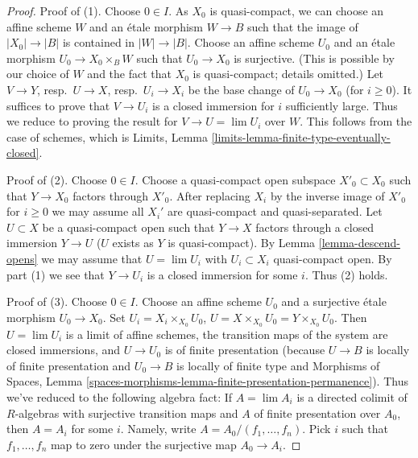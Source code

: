 \begin{proof}
Proof of (1). Choose $0 \in I$. As $X_0$ is quasi-compact, we can choose
an affine scheme $W$ and an \'etale morphism $W \to B$ such that the image of
$|X_0| \to |B|$ is contained in $|W| \to |B|$. 
Choose an affine scheme $U_0$ and an \'etale morphism
$U_0 \to X_0 \times_B W$ such that $U_0 \to X_0$ is surjective.
(This is possible by our choice of $W$ and the fact that $X_0$ is
quasi-compact; details omitted.)
Let $V \to Y$, resp.\ $U \to X$, resp.\ $U_i \to X_i$ be the base change
of $U_0 \to X_0$ (for $i \geq 0$). It suffices to prove that $V \to U_i$
is a closed immersion for $i$ sufficiently large. Thus we reduce
to proving the result for $V \to U = \lim U_i$ over $W$. This follows from
the case of schemes, which is
Limits, Lemma \ref{limits-lemma-finite-type-eventually-closed}.

\medskip\noindent
Proof of (2). Choose $0 \in I$. Choose a quasi-compact open subspace
$X'_0 \subset X_0$ such that $Y \to X_0$ factors through $X'_0$.
After replacing $X_i$ by the inverse image of $X'_0$ for $i \geq 0$
we may assume all $X_i'$ are quasi-compact and quasi-separated.
Let $U \subset X$ be a quasi-compact open such that $Y \to X$ factors
through a closed immersion $Y \to U$ ($U$ exists as $Y$ is quasi-compact). By
Lemma \ref{lemma-descend-opens}
we may assume that $U = \lim U_i$ with $U_i \subset X_i$ quasi-compact
open. By part (1) we see that $Y \to U_i$ is a closed immersion for some
$i$. Thus (2) holds.

\medskip\noindent
Proof of (3). Choose $0 \in I$. Choose an affine scheme $U_0$
and a surjective \'etale morphism $U_0 \to X_0$.
Set $U_i = X_i \times_{X_0} U_0$,
$U = X \times_{X_0} U_0 = Y \times_{X_0} U_0$. Then $U = \lim U_i$ is a
limit of affine schemes, the transition maps of the system are closed
immersions, and $U \to U_0$ is of finite presentation (because
$U \to B$ is locally of finite presentation and $U_0 \to B$ is locally
of finite type and
Morphisms of Spaces, Lemma
\ref{spaces-morphisms-lemma-finite-presentation-permanence}).
Thus we've reduced to the following algebra fact: If $A = \lim A_i$
is a directed colimit of $R$-algebras with surjective transition
maps and $A$ of finite presentation over $A_0$, then $A = A_i$ for
some $i$. Namely, write $A = A_0/(f_1, \ldots, f_n)$. Pick $i$ such
that $f_1, \ldots, f_n$ map to zero under the surjective map $A_0 \to A_i$.


\end{proof}
